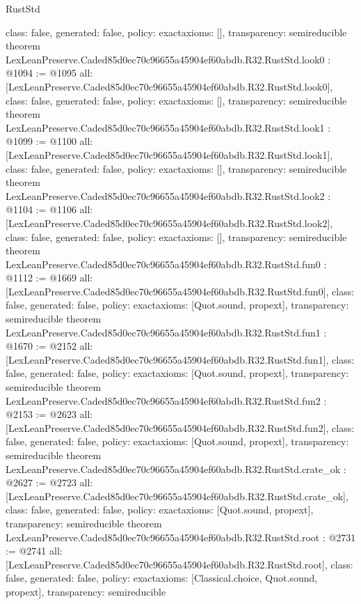 \begin{lexlean}{RustStd}
\begin{coremodule}
{  class: false,
  generated: false,
  policy: exact{axioms: []},
  transparency: semireducible
}
theorem LexLeanPreserve.Caded85d0ec70c96655a45904ef60abdb.R32.RustStd.look0 : @1094 := @1095 {
  all: [LexLeanPreserve.Caded85d0ec70c96655a45904ef60abdb.R32.RustStd.look0],
  class: false,
  generated: false,
  policy: exact{axioms: []},
  transparency: semireducible
}
theorem LexLeanPreserve.Caded85d0ec70c96655a45904ef60abdb.R32.RustStd.look1 : @1099 := @1100 {
  all: [LexLeanPreserve.Caded85d0ec70c96655a45904ef60abdb.R32.RustStd.look1],
  class: false,
  generated: false,
  policy: exact{axioms: []},
  transparency: semireducible
}
theorem LexLeanPreserve.Caded85d0ec70c96655a45904ef60abdb.R32.RustStd.look2 : @1104 := @1106 {
  all: [LexLeanPreserve.Caded85d0ec70c96655a45904ef60abdb.R32.RustStd.look2],
  class: false,
  generated: false,
  policy: exact{axioms: []},
  transparency: semireducible
}
theorem LexLeanPreserve.Caded85d0ec70c96655a45904ef60abdb.R32.RustStd.fun0 : @1112 := @1669 {
  all: [LexLeanPreserve.Caded85d0ec70c96655a45904ef60abdb.R32.RustStd.fun0],
  class: false,
  generated: false,
  policy: exact{axioms: [Quot.sound, propext]},
  transparency: semireducible
}
theorem LexLeanPreserve.Caded85d0ec70c96655a45904ef60abdb.R32.RustStd.fun1 : @1670 := @2152 {
  all: [LexLeanPreserve.Caded85d0ec70c96655a45904ef60abdb.R32.RustStd.fun1],
  class: false,
  generated: false,
  policy: exact{axioms: [Quot.sound, propext]},
  transparency: semireducible
}
theorem LexLeanPreserve.Caded85d0ec70c96655a45904ef60abdb.R32.RustStd.fun2 : @2153 := @2623 {
  all: [LexLeanPreserve.Caded85d0ec70c96655a45904ef60abdb.R32.RustStd.fun2],
  class: false,
  generated: false,
  policy: exact{axioms: [Quot.sound, propext]},
  transparency: semireducible
}
theorem LexLeanPreserve.Caded85d0ec70c96655a45904ef60abdb.R32.RustStd.crate_ok : @2627 := @2723 {
  all: [LexLeanPreserve.Caded85d0ec70c96655a45904ef60abdb.R32.RustStd.crate_ok],
  class: false,
  generated: false,
  policy: exact{axioms: [Quot.sound, propext]},
  transparency: semireducible
}
theorem LexLeanPreserve.Caded85d0ec70c96655a45904ef60abdb.R32.RustStd.root : @2731 := @2741 {
  all: [LexLeanPreserve.Caded85d0ec70c96655a45904ef60abdb.R32.RustStd.root],
  class: false,
  generated: false,
  policy: exact{axioms: [Classical.choice, Quot.sound, propext]},
  transparency: semireducible
}


\end{coremodule}
\end{lexlean}
